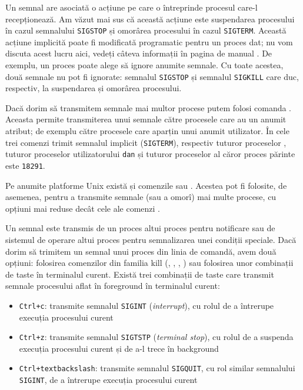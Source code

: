 Un semnal are asociată o acțiune pe care o întreprinde procesul care-l
recepționează. Am văzut mai sus că această acțiune este suspendarea procesului
în cazul semnalului \texttt{SIGSTOP} și omorârea procesului în cazul \texttt{SIGTERM}. Această
acțiune implicită poate fi modificată programatic pentru un proces dat; nu vom
discuta acest lucru aici, vedeți câteva informații în pagina de manual . De exemplu, un proces poate alege să ignore anumite semnale. Cu toate
acestea, două semnale nu pot fi ignorate: semnalul \texttt{SIGSTOP} și semnalul \texttt{SIGKILL}
care duc, respectiv, la suspendarea și omorârea procesului.

Dacă dorim să transmitem semnale mai multor procese putem folosi comanda .
Aceasta permite transmiterea unui semnale către procesele care au un anumit atribut; de exemplu către
procesele care aparțin unui anumit utilizator.
În  cele trei comenzi trimit semnalul implicit (\texttt{SIGTERM}), respectiv tuturor proceselor , tuturor proceselor utilizatorului \texttt{dan} și tuturor proceselor al căror proces părinte este \texttt{18291}.


Pe anumite platforme Unix există și comenzile  sau . Acestea pot fi
folosite, de asemenea, pentru a transmite semnale (sau a omorî) mai multe
procese, cu opțiuni mai reduse decât cele ale comenzi .

Un semnal este transmis de un proces altui proces pentru notificare sau de
sistemul de operare altui proces pentru semnalizarea unei condiții speciale.
Dacă dorim să trimitem un semnal unui proces din linia de comandă, avem două
opțiuni: folosirea comenzilor din familia kill (, , , ) sau
folosirea unor combinații de taste în terminalul curent. Există trei combinații
de taste care transmit semnale procesului aflat în foreground în terminalul
curent:

\begin{itemize}
  \item \texttt{Ctrl+c}: transmite semnalul \texttt{SIGINT} (\textit{interrupt}), cu rolul de a
		întrerupe execuția procesului curent
  \item \texttt{Ctrl+z}: transmite semnalul \texttt{SIGTSTP} (\textit{terminal stop}), cu rolul de a suspenda execuția
		procesului curent și de a-l trece în background
  \item \texttt{Ctrl+textbackslash{}}: transmite semnalul \texttt{SIGQUIT}, cu rol similar
                semnalului \texttt{SIGINT}, de a întrerupe execuția procesului curent
\end{itemize}

